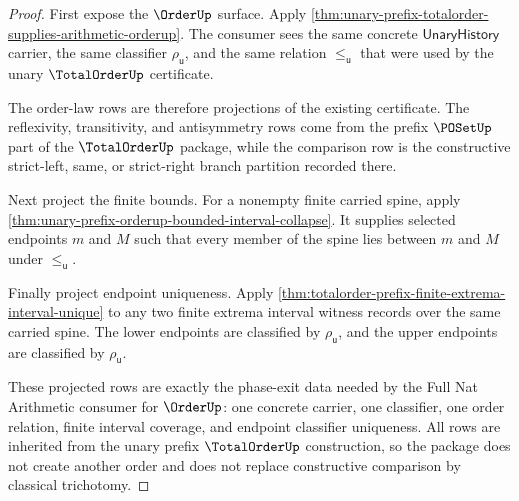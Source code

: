 \begin{proof}
First expose the $\OrderUp$ surface. Apply
\autoref{thm:unary-prefix-totalorder-supplies-arithmetic-orderup}. The consumer
sees the same concrete $\mathsf{UnaryHistory}$ carrier, the same classifier
$\rho_{\mathsf{u}}$, and the same relation $\le_{\mathsf{u}}$ that were used
by the unary $\TotalOrderUp$ certificate.

The order-law rows are therefore projections of the existing certificate. The
reflexivity, transitivity, and antisymmetry rows come from the prefix
$\POSetUp$ part of the $\TotalOrderUp$ package, while the comparison row is
the constructive strict-left, same, or strict-right branch partition recorded
there.

Next project the finite bounds. For a nonempty finite carried spine, apply
\autoref{thm:unary-prefix-orderup-bounded-interval-collapse}. It supplies
selected endpoints $m$ and $M$ such that every member of the spine lies between
$m$ and $M$ under $\le_{\mathsf{u}}$.

Finally project endpoint uniqueness. Apply
\autoref{thm:totalorder-prefix-finite-extrema-interval-unique} to any two
finite extrema interval witness records over the same carried spine. The lower
endpoints are classified by $\rho_{\mathsf{u}}$, and the upper endpoints are
classified by $\rho_{\mathsf{u}}$.

These projected rows are exactly the phase-exit data needed by the Full Nat
Arithmetic consumer for $\OrderUp$: one concrete carrier, one classifier, one
order relation, finite interval coverage, and endpoint classifier uniqueness.
All rows are inherited from the unary prefix $\TotalOrderUp$ construction, so
the package does not create another order and does not replace constructive
comparison by classical trichotomy.
\end{proof}

